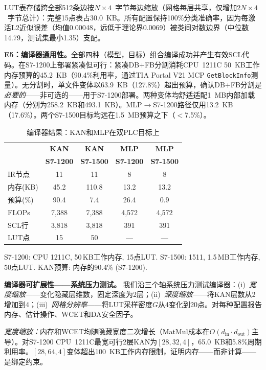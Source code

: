 \documentclass[journal,onecolumn]{IEEEtran}
\theoremstyle{definition}
\theoremstyle{plain}
\theoremstyle{remark}
\begin{document}
LUT表存储跨全部512条边按$N \times 4$~字节每边缩放（网格每层共享，仅增加$2N \times 4$~字节总计）：完整15点表占30.0~KB。所有配置保持100\%分类准确率，因为每激活L2近似误差（均值0.00048，远低于理论界0.0069）被类间对数边界（中位数14.79，测试集最小1.35）支配。

\noindent\textbf{E5：编译器通用性。}全部四种（模型，目标）组合编译成功并产生有效SCL代码。在S7-1200上部署紧凑但可行：紧凑DB+FB分割消耗CPU~1211C 50~KB工作内存预算的45.2~KB（90.4\%利用率，通过TIA Portal V21 MCP \texttt{GetBlockInfo}测量）。无分割时，单文件变体以63.9~KB（127.8\%）超出预算，确认DB+FB分割是\textit{必要的}——非可选的——用于S7-1200部署。两种变体均舒适适配1~MB内部加载内存（分别为258.2~KB和493.1~KB）。MLP$\to$S7-1200路径仅用13.2~KB（17.6\%）。两个S7-1500目标均远在1.5~MB预算之下（$<$7.5\%）。

\begin{table}[!t]
\centering
\caption{编译器结果：KAN和MLP在双PLC目标上}
\label{tab:compiler}
\footnotesize
\begin{tabular}{@{}lcccc@{}}
\toprule
& \textbf{KAN} & \textbf{KAN} & \textbf{MLP} & \textbf{MLP} \\
& \textbf{S7-1200} & \textbf{S7-1500} & \textbf{S7-1200} & \textbf{S7-1500} \\
\midrule
IR节点   & 11 & 11 & 8 & 8 \\
内存(KB) & 45.2 & 110.8 & 13.2 & 13.2 \\
预算(\%)  & 90.4 & 7.4 & 26.4 & 0.9 \\
FLOPs    & 7,388 & 7,388 & 4,572 & 4,572 \\
SCL行    & 3,818 & 3,818 & 391 & 391 \\
LUT点    & 15 & 50 & --- & --- \\
\bottomrule
\end{tabular}
\vspace{1pt}
{\scriptsize S7-1200: CPU 1211C, 50\,KB工作内存, 15点LUT. S7-1500: 1511, 1.5\,MB工作内存, 50点LUT. KAN预算: 内存的90.4\% (S7-1200).}
\end{table}

\vspace{4pt}
\noindent\textbf{编译器可扩展性——系统压力测试。}
我们沿三个轴系统压力测试编译器：(i)~\textit{宽度缩放}——变化隐藏层维数，固定深度为2层；(ii)~\textit{深度缩放}——将KAN层数从2增加到4；(iii)~\textit{网格分辨率}——将LUT采样密度$G$从4变化到20点。对每种配置报告内存、估计操作、WCET和DA安全因子。

\textit{宽度缩放：}内存和WCET均随隐藏宽度二次增长（MatMul成本在$O(d_{\text{in}}\cdot d_{\text{out}})$主导）。对S7-1200 CPU~1211C最宽可行2层KAN为$[28,32,4]$，65.0~KB和5.8\%周期利用率。$[28,64,4]$变体超出100~KB工作内存限制，证明内存——而非计算——是绑定约束。
\end{document}
